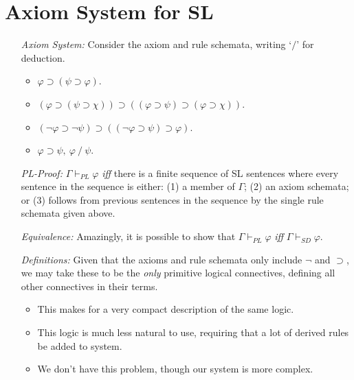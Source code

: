\documentclass[a4paper, 11pt]{article} %
\begin{document}
\section*{Axiom System for SL}

\begin{enumerate}
  \item[\it Axiom System:] Consider the axiom and rule schemata, writing `$/$' for deduction.
    \begin{itemize}
      \item $\varphi \supset (\psi \supset \varphi)$.
      \item $(\varphi \supset (\psi \supset \chi)) \supset ((\varphi \supset \psi) \supset (\varphi \supset \chi))$.
      \item $(\neg\varphi \supset \neg\psi) \supset ((\neg\varphi \supset \psi) \supset \varphi)$.
      \item $\varphi \supset \psi,\ \varphi\ /\ \psi$.
    \end{itemize}
  \item[\it PL-Proof:] $\Gamma \vdash_{PL} \varphi$ \textit{iff} there is a finite sequence of SL sentences where every sentence in the sequence is either: (1) a member of $\Gamma$; (2) an axiom schemata; or (3) follows from previous sentences in the sequence by the single rule schemata given above.
  \item[\it Equivalence:] Amazingly, it is possible to show that $\Gamma \vdash_{PL} \varphi$ \textit{iff} $\Gamma \vdash_{SD} \varphi$. 
  \item[\it Definitions:] Given that the axioms and rule schemata only include $\neg$ and $\supset$, we may take these to be the \textit{only} primitive logical connectives, defining all other connectives in their terms. 
    \begin{itemize}
      \item This makes for a very compact description of the same logic.
      \item This logic is much less natural to use, requiring that a lot of derived rules be added to system.
      \item We don't have this problem, though our system is more complex.
    \end{itemize}   
\end{enumerate}

%
\end{document}
